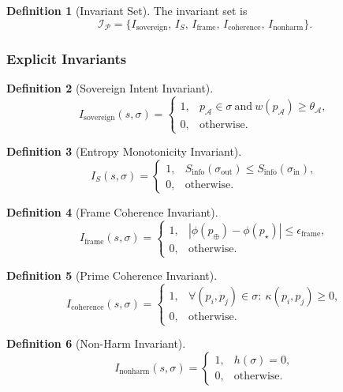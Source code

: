 \documentclass[12pt]{article}
\theoremstyle{definition}
\newtheorem{definition}{Definition}[section]
\theoremstyle{plain}
\begin{document}
\begin{definition}[Invariant Set]
The invariant set is
\[
\mathcal{I}_{\mathcal{P}} =
\{ I_{\mathrm{sovereign}},\,
   I_{S},\,
   I_{\mathrm{frame}},\,
   I_{\mathrm{coherence}},\,
   I_{\mathrm{nonharm}} \}.
\]
\end{definition}

\subsubsection{Explicit Invariants}

\begin{definition}[Sovereign Intent Invariant]
\[
I_{\mathrm{sovereign}}(s,\sigma) =
\begin{cases}
1, & p_{\mathcal{A}} \in \sigma \ \text{and}\ w(p_{\mathcal{A}}) \ge \theta_{\mathcal{A}},\\
0, & \text{otherwise}.
\end{cases}
\]
\end{definition}

\begin{definition}[Entropy Monotonicity Invariant]
\[
I_{S}(s,\sigma) =
\begin{cases}
1, & S_{\mathrm{info}}(\sigma_{\mathrm{out}})
    \le S_{\mathrm{info}}(\sigma_{\mathrm{in}}),\\
0, & \text{otherwise}.
\end{cases}
\]
\end{definition}

\begin{definition}[Frame Coherence Invariant]
\[
I_{\mathrm{frame}}(s,\sigma) =
\begin{cases}
1, & |\phi(p_{\oplus}) - \phi(p_{\star})|
      \le \epsilon_{\mathrm{frame}},\\
0, & \text{otherwise}.
\end{cases}
\]
\end{definition}

\begin{definition}[Prime Coherence Invariant]
\[
I_{\mathrm{coherence}}(s,\sigma) =
\begin{cases}
1, & \forall (p_i,p_j)\in\sigma:\ \kappa(p_i,p_j)\ge 0,\\
0, & \text{otherwise}.
\end{cases}
\]
\end{definition}

\begin{definition}[Non-Harm Invariant]
\[
I_{\mathrm{nonharm}}(s,\sigma) =
\begin{cases}
1, & h(\sigma)=0,\\
0, & \text{otherwise}.
\end{cases}
\]
\end{definition}
\end{document}
